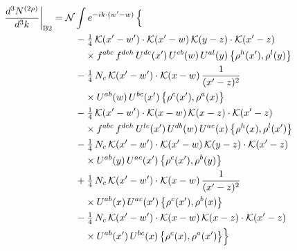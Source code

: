 \documentclass[10pt]{article}
\numberwithin{equation}{section}
\newcommand{\KK}{\mathcal K}
\newcommand{\NN}{\mathcal N}
\begin{document}
\begin{align}
\frac{d^3N^{(2\rho)}}{d^3k}\bigg|_{\rm B2}={}&\NN\int e^{-ik\cdot(w'-w)}\,\Big\{\notag\\
&\quad -\tfrac14\,\KK(x'-w')\cdot\KK(x'-w)\,\KK(y-z)\cdot\KK(x'-z)\notag\\
&\qquad\times f^{abc}\,f^{deh}\,U^{dc}(x')\,U^{eb}(w)\,U^{al}(y)\,\big\{\rho^{h}(x'),\rho^{l}(y)\big\}\notag\\
&\quad -\tfrac14\,N_{c}\,\KK(x'-w')\cdot\KK(x-w)\,\frac{1}{(x'-z)^2}\notag\\
&\qquad\times U^{ab}(w)\,U^{bc}(x')\,\big\{\rho^{c}(x'),\rho^{a}(x)\big\}\notag\\
&\quad -\tfrac14\,\KK(x'-w')\cdot\KK(x-w)\,\KK(x-z)\cdot\KK(x'-z)\notag\\
&\qquad\times f^{abc}\,f^{deh}\,U^{lc}(x')\,U^{db}(w)\,U^{ae}(x)\,\big\{\rho^{h}(x),\rho^{l}(x')\big\}\notag\\
&\quad -\tfrac14\,N_{c}\,\KK(x'-w')\cdot\KK(x'-w)\,\KK(y-z)\cdot\KK(x'-z)\notag\\
&\qquad\times U^{ab}(y)\,U^{ac}(x')\,\big\{\rho^{c}(x'),\rho^{b}(y)\big\}\notag\\
&\quad +\tfrac14\,N_{c}\,\KK(x'-w')\cdot\KK(x-w)\,\frac{1}{(x'-z)^2}\notag\\
&\qquad\times U^{ab}(x)\,U^{ac}(x')\,\big\{\rho^{c}(x'),\rho^{b}(x)\big\}\notag\\
&\quad -\tfrac14\,N_{c}\,\KK(x'-w')\cdot\KK(x-w)\,\KK(x-z)\cdot\KK(x'-z)\notag\\
&\qquad\times U^{ab}(x')\,U^{bc}(x)\,\big\{\rho^{c}(x),\rho^{a}(x')\big\}\Big\}\label{eq:sum-B2}
\end{align}
\end{document}

